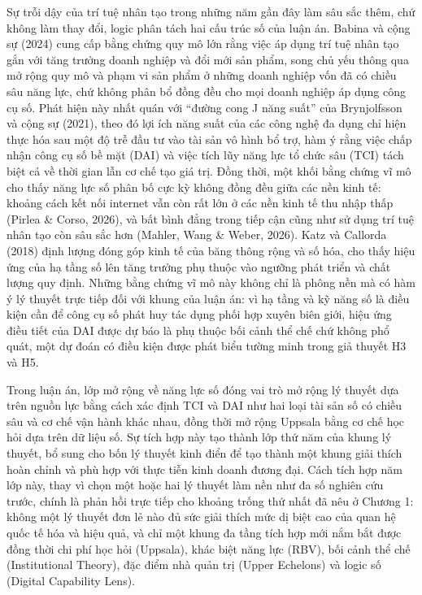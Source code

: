 \documentclass[
  a4paper,
  13pt]{extreport}
\begin{document}
Sự trỗi dậy của trí tuệ nhân tạo trong những năm gần đây làm sâu sắc
thêm, chứ không làm thay đổi, logic phân tách hai cấu trúc số của luận
án. Babina và cộng sự (2024) cung cấp bằng chứng quy mô lớn rằng việc áp
dụng trí tuệ nhân tạo gắn với tăng trưởng doanh nghiệp và đổi mới sản
phẩm, song chủ yếu thông qua mở rộng quy mô và phạm vi sản phẩm ở những
doanh nghiệp vốn đã có chiều sâu năng lực, chứ không phân bổ đồng đều
cho mọi doanh nghiệp áp dụng công cụ số. Phát hiện này nhất quán với
``đường cong J năng suất'' của Brynjolfsson và cộng sự (2021), theo đó
lợi ích năng suất của các công nghệ đa dụng chỉ hiện thực hóa sau một độ
trễ đầu tư vào tài sản vô hình bổ trợ, hàm ý rằng việc chấp nhận công cụ
số bề mặt (DAI) và việc tích lũy năng lực tổ chức sâu (TCI) tách biệt cả
về thời gian lẫn cơ chế tạo giá trị. Đồng thời, một khối bằng chứng vĩ
mô cho thấy năng lực số phân bố cực kỳ không đồng đều giữa các nền kinh
tế: khoảng cách kết nối internet vẫn còn rất lớn ở các nền kinh tế thu
nhập thấp (Pirlea \& Corso, 2026), và bất bình đẳng trong tiếp cận cũng
như sử dụng trí tuệ nhân tạo còn sâu sắc hơn (Mahler, Wang \& Weber,
2026). Katz và Callorda (2018) định lượng đóng góp kinh tế của băng
thông rộng và số hóa, cho thấy hiệu ứng của hạ tầng số lên tăng trưởng
phụ thuộc vào ngưỡng phát triển và chất lượng quy định. Những bằng chứng
vĩ mô này không chỉ là phông nền mà có hàm ý lý thuyết trực tiếp đối với
khung của luận án: vì hạ tầng và kỹ năng số là điều kiện cần để công cụ
số phát huy tác dụng phối hợp xuyên biên giới, hiệu ứng điều tiết của
DAI được dự báo là phụ thuộc bối cảnh thể chế chứ không phổ quát, một dự
đoán có điều kiện được phát biểu tường minh trong giả thuyết H3 và H5.

Trong luận án, lớp mở rộng về năng lực số đóng vai trò mở rộng lý thuyết
dựa trên nguồn lực bằng cách xác định TCI và DAI như hai loại tài sản số
có chiều sâu và cơ chế vận hành khác nhau, đồng thời mở rộng Uppsala
bằng cơ chế học hỏi dựa trên dữ liệu số. Sự tích hợp này tạo thành lớp
thứ năm của khung lý thuyết, bổ sung cho bốn lý thuyết kinh điển để tạo
thành một khung giải thích hoàn chỉnh và phù hợp với thực tiễn kinh
doanh đương đại. Cách tích hợp năm lớp này, thay vì chọn một hoặc hai lý
thuyết làm nền như đa số nghiên cứu trước, chính là phản hồi trực tiếp
cho khoảng trống thứ nhất đã nêu ở Chương 1: không một lý thuyết đơn lẻ
nào đủ sức giải thích mức dị biệt cao của quan hệ quốc tế hóa và hiệu
quả, và chỉ một khung đa tầng tích hợp mới nắm bắt được đồng thời chi
phí học hỏi (Uppsala), khác biệt năng lực (RBV), bối cảnh thể chế
(Institutional Theory), đặc điểm nhà quản trị (Upper Echelons) và logic
số (Digital Capability Lens).
\end{document}
